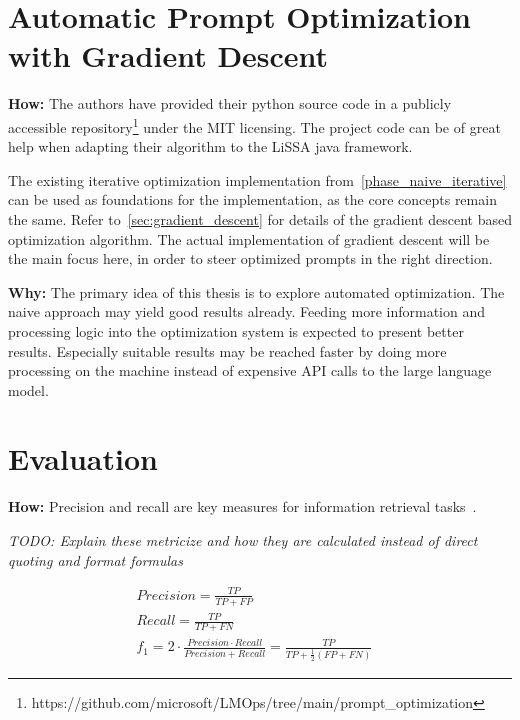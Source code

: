 \section{Automatic Prompt Optimization with Gradient Descent}
\label{approach:sec:gradient_descent}
\textbf{How:} The authors have provided their python source code in a publicly accessible repository\footnote{https://github.com/microsoft/LMOps/tree/main/prompt\_optimization} under the MIT licensing.
The project code can be of great help when adapting their algorithm to the LiSSA java framework.

The existing iterative optimization implementation from~\ref{phase_naive_iterative} can be used as foundations for the implementation, as the core concepts remain the same.
Refer to~\ref{sec:gradient_descent} for details of the gradient descent based optimization algorithm.
The actual implementation of gradient descent will be the main focus here, in order to steer optimized prompts in the right direction.


\textbf{Why:} The primary idea of this thesis is to explore automated optimization.
The naive approach may yield good results already.
Feeding more information and processing logic into the optimization system is expected to present better results.
Especially suitable results may be reached faster by doing more processing on the machine instead of expensive API calls to the large language model.


\section{Evaluation}
\label{approach:sec:evaluation}
\textbf{How:} Precision and recall are key measures for information retrieval tasks~\cite{hayes2006AdvancingCandidate}.

\textit{TODO: Explain these metricize and how they are calculated instead of direct quoting and format formulas}

\begin{align*}
    Precision = \frac{TP}{TP + FP} &\\
    Recall = \frac{TP}{TP + FN} &\\
    f_1 = 2 \cdot \frac{Precision \cdot Recall}{Precision + Recall} = \frac{TP}{TP + \frac{1}{2}(FP + FN)} &
\end{align*}



